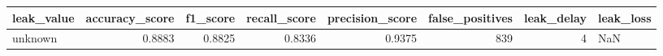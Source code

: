 \begin{tabular}{lrrrrrrl}
\toprule
leak\_value & accuracy\_score & f1\_score & recall\_score & precision\_score & false\_positives & leak\_delay & leak\_loss \\
\midrule
unknown & 0.8883 & 0.8825 & 0.8336 & 0.9375 & 839 & 4 & NaN \\
\bottomrule
\end{tabular}
